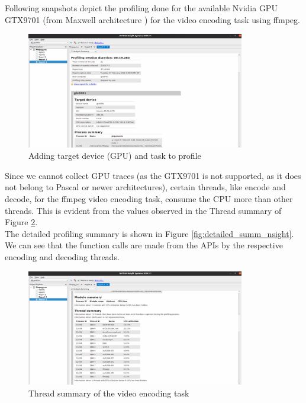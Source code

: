\documentclass[a4paper,12pt, final]{report}
\begin{document}
\noindent Following snapshots depict the profiling done for the available Nvidia GPU GTX9701 (from Maxwell architecture \cite{gpu_gtx9701}) for the video encoding task using ffmpeg.\\

\begin{figure}[h]
    \centering
    \includegraphics[width=0.85\textwidth]{images/nsight1.png}
    \caption{Adding target device (GPU) and task to profile}
    \label{fig:add_target_dev_nsight}
\end{figure}

\noindent Since we cannot collect GPU traces (as the GTX9701 is not supported, as it does not belong to Pascal or newer architectures), certain threads, like encode and decode, for the ffmpeg video encoding task, consume the CPU more than other threads. This is evident from the values observed in the Thread summary of Figure \ref{fig:thread_summ_nsight}.\\

\noindent The detailed profiling summary is shown in Figure \ref{fig:detailed_summ_nsight}. We can see that the function calls are made from the APIs by the respective encoding and decoding threads.

\begin{figure}[H]
    \centering
    \includegraphics[width=0.85\textwidth]{images/nsight2.png}
    \caption{Thread summary of the video encoding task}
    \label{fig:thread_summ_nsight}
\end{figure}
\end{document}
